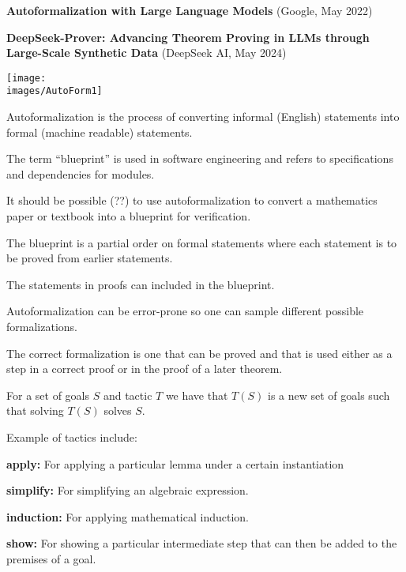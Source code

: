 {

{\huge
{\bf Autoformalization with Large Language Models} (Google, May 2022)

\vfill
{\bf DeepSeek-Prover: Advancing Theorem Proving in
LLMs through Large-Scale Synthetic Data} (DeepSeek AI, May 2024)
}

\vfill
\centerline{\texttt{[image: \\images/AutoForm1]}}

\vfill
Autoformalization is the process of converting informal (English) statements into formal (machine readable) statements.


The term ``blueprint'' is used in
software engineering and refers to specifications and dependencies for modules.

\vfill
It should be possible (??) to use autoformalization to convert a mathematics paper or textbook into a blueprint
for verification.

\vfill
The blueprint is a partial order on formal statements where each statement is to be proved from earlier statements.

\vfill
The statements in proofs can included in the blueprint.


\vfill
Autoformalization can be error-prone so one can sample different possible formalizations.

\vfill
The correct formalization is one that can be proved and that is used either as a step in a correct proof or in the proof of a later theorem.



\vfill
For a set of goals $S$ and tactic $T$ we have that $T(S)$ is a new set of goals such that solving $T(S)$ solves $S$.

\vfill
Example of tactics include:

\vfill
{\bf apply:} For applying a particular lemma under a certain instantiation

\vfill
{\bf simplify:} For simplifying an algebraic expression.

\vfill
{\bf induction:} For applying mathematical induction.

\vfill
{\bf show:} For showing a particular intermediate step that can then be added to the premises of a goal.


}
